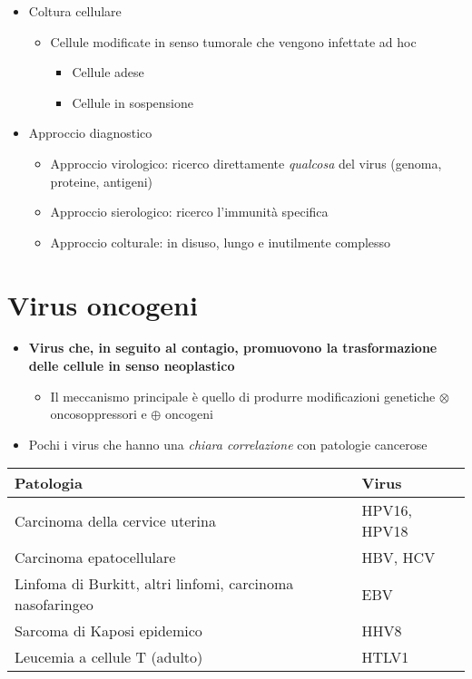 \documentclass[italian,]{article}
\providecommand{\tightlist}{%
  \setlength{\itemsep}{0pt}\setlength{\parskip}{0pt}}
\newcommand{\att}[0]{ $\oplus$ }                                        %
\newcommand{\ini}[0]{ $\otimes$ }                                       %
\begin{document}
\begin{itemize}
\tightlist
\item
  Coltura cellulare

  \begin{itemize}
  \tightlist
  \item
    Cellule modificate in senso tumorale che vengono infettate ad hoc

    \begin{itemize}
    \tightlist
    \item
      Cellule adese
    \item
      Cellule in sospensione
    \end{itemize}
  \end{itemize}
\item
  Approccio diagnostico

  \begin{itemize}
  \tightlist
  \item
    Approccio virologico: ricerco direttamente \emph{qualcosa} del virus
    (genoma, proteine, antigeni)
  \item
    Approccio sierologico: ricerco l'immunità specifica
  \item
    Approccio colturale: in disuso, lungo e inutilmente complesso
  \end{itemize}
\end{itemize}

\hypertarget{virus-oncogeni}{%
\section{Virus oncogeni}\label{virus-oncogeni}}

\begin{itemize}
\tightlist
\item
  \textbf{Virus che, in seguito al contagio, promuovono la
  trasformazione delle cellule in senso neoplastico}

  \begin{itemize}
  \tightlist
  \item
    Il meccanismo principale è quello di produrre modificazioni
    genetiche \ini oncosoppressori e \att oncogeni
  \end{itemize}
\item
  Pochi i virus che hanno una \emph{chiara correlazione} con patologie
  cancerose
\end{itemize}

\begin{longtable}[]{@{}ll@{}}
\toprule
Patologia & Virus\tabularnewline
\midrule
\endhead
Carcinoma della cervice uterina & HPV16, HPV18\tabularnewline
Carcinoma epatocellulare & HBV, HCV\tabularnewline
Linfoma di Burkitt, altri linfomi, carcinoma nasofaringeo &
EBV\tabularnewline
Sarcoma di Kaposi epidemico & HHV8\tabularnewline
Leucemia a cellule T (adulto) & HTLV1\tabularnewline
\bottomrule
\end{longtable}
\end{document}
